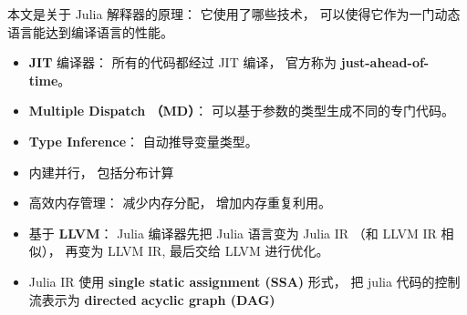 
\begin{issues}
\issueDraft
\end{issues}

本文是关于 Julia 解释器的原理： 它使用了哪些技术， 可以使得它作为一门动态语言能达到编译语言的性能。

\begin{itemize}
\item \textbf{JIT} 编译器： 所有的代码都经过 JIT 编译， 官方称为 \textbf{just-ahead-of-time}。
\item \textbf{Multiple Dispatch （MD）}： 可以基于参数的类型生成不同的专门代码。
\item \textbf{Type Inference}： 自动推导变量类型。
\item 内建并行， 包括分布计算
\item 高效内存管理： 减少内存分配， 增加内存重复利用。
\item 基于 \textbf{LLVM}： Julia 编译器先把 Julia 语言变为 Julia IR （和 LLVM IR 相似）， 再变为 LLVM IR, 最后交给 LLVM 进行优化。
\item Julia IR 使用 \textbf{single static assignment (SSA)} 形式， 把 julia 代码的控制流表示为 \textbf{directed acyclic graph (DAG)}
\end{itemize}
